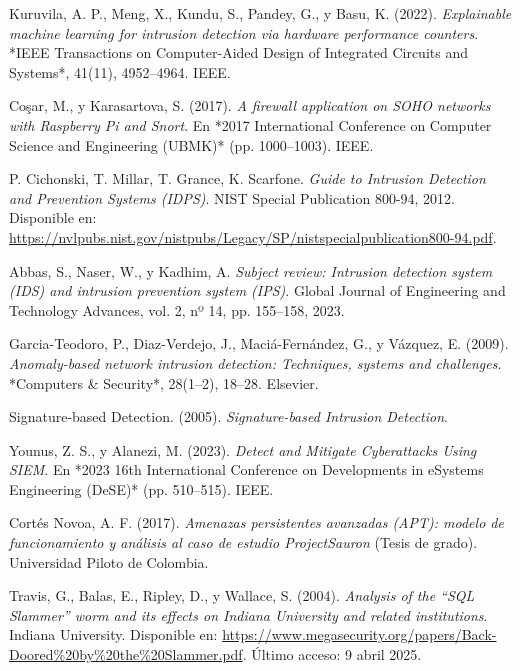 \documentclass[11pt,a4paper,twoside]{report}
\begin{document}
\begin{thebibliography}{35}
	Kuruvila, A. P., Meng, X., Kundu, S., Pandey, G., y Basu, K. (2022). \textit{Explainable machine learning for intrusion detection via hardware performance counters}. *IEEE Transactions on Computer-Aided Design of Integrated Circuits and Systems*, 41(11), 4952--4964. IEEE.
	
	Coşar, M., y Karasartova, S. (2017). \textit{A firewall application on SOHO networks with Raspberry Pi and Snort}. En *2017 International Conference on Computer Science and Engineering (UBMK)* (pp. 1000--1003). IEEE.
	
	P. Cichonski, T. Millar, T. Grance, K. Scarfone. \textit{Guide to Intrusion Detection and Prevention Systems (IDPS)}. NIST Special Publication 800-94, 2012. Disponible en: \url{https://nvlpubs.nist.gov/nistpubs/Legacy/SP/nistspecialpublication800-94.pdf}.
	
	Abbas, S., Naser, W., y Kadhim, A. \textit{Subject review: Intrusion detection system (IDS) and intrusion prevention system (IPS)}. Global Journal of Engineering and Technology Advances, vol. 2, nº 14, pp. 155–158, 2023.
	
	Garcia-Teodoro, P., Diaz-Verdejo, J., Maciá-Fernández, G., y Vázquez, E. (2009). \textit{Anomaly-based network intrusion detection: Techniques, systems and challenges}. *Computers \& Security*, 28(1–2), 18--28. Elsevier.
	
	
	Signature-based Detection. (2005). \textit{Signature-based Intrusion Detection}.
	
	Younus, Z. S., y Alanezi, M. (2023). \textit{Detect and Mitigate Cyberattacks Using SIEM}. En *2023 16th International Conference on Developments in eSystems Engineering (DeSE)* (pp. 510--515). IEEE.
	
	Cortés Novoa, A. F. (2017). \textit{Amenazas persistentes avanzadas (APT): modelo de funcionamiento y análisis al caso de estudio ProjectSauron} (Tesis de grado). Universidad Piloto de Colombia.
	
	Travis, G., Balas, E., Ripley, D., y Wallace, S. (2004). \textit{Analysis of the “SQL Slammer” worm and its effects on Indiana University and related institutions}. Indiana University. Disponible en: \url{https://www.megasecurity.org/papers/Back-Doored%20by%20the%20Slammer.pdf}. Último acceso: 9 abril 2025.
	

\end{thebibliography}
\end{document}
